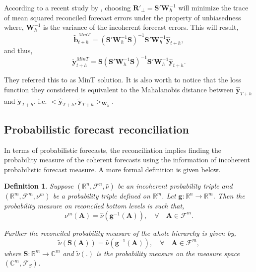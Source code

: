 \documentclass[a4paper, 11pt]{article}
\newtheorem{definition}{Definition}[section]
\begin{document}
	According to a recent study by \citet{Wickramasuriya2017}, choosing $\bm{R}'_\bot = \bm{S}'\bm{W}^{-1}_{h}$ will minimize the trace of mean squared reconciled forecast errors under the property of unbiasedness where, $\bm{W}^{-1}_{h}$ is the variance of the incoherent forecast errors. This will result,
	\begin{equation*}
	\tilde{\bm{b}}^{MinT}_{t+h}=(\bm{S}'\bm{W}^{-1}_{h} \bm{S})^{-1}\bm{S}'\bm{W}^{-1}_{h} \hat{\bm{y}}_{t+h},
	\end{equation*}
	and thus,
	\begin{equation}
	\tilde{\bm{y}}^{MinT}_{t+h}=\bm{S}(\bm{S}' \bm{W}^{-1}_{h}\bm{S})^{-1}\bm{S}'\bm{W}^{-1}_{h} \hat{\bm{y}}_{t+h}.
	\end{equation}
	
	They referred this to as MinT solution. It is also worth to notice that the loss function they considered is equivalent to the Mahalanobis distance between $\hat{\bm{y}}_{T+h}$ and $\tilde{\bm{y}}_{T+h}$. i.e. $<\hat{\bm{y}}_{T+h}, \tilde{\bm{y}}_{T+h}>_{\bm{W}_h}$.
	
	\subsection{Probabilistic forecast reconciliation}
	
	In terms of probabilistic forecasts, the reconciliation implies finding the probability measure of the coherent forecasts using the information of incoherent probabilistic forecast measure. A more formal definition is given below.
	
	\begin{definition} \label{def:reconprob}
		Suppose $(\mathbb{R}^n, \mathscr{F}^n, \hat{\nu})$ be an incoherent probability triple and $(\mathbb{R}^m, \mathscr{F}^m, \nu^m)$ be a probability triple defined on $\mathbb{R}^m$. Let $\bm{g}:\mathbb{R}^n \rightarrow \mathbb{R}^m $. Then the probability measure on reconciled bottom levels is such that,
		\begin{equation}
		\nu^m(\bm{A}) = \hat{\nu}(\bm{g}^{-1}(\bm{A})), \quad \forall \quad \bm{A} \in \mathscr{F}^m.
		\end{equation}
		
		Further the reconciled probability measure of the whole hierarchy is given by,
		\begin{equation}
		\tilde{\nu}(\bm{S}(\bm{A})) = \hat{\nu}(\bm{g}^{-1}(\bm{A})), \quad \forall \quad \bm{A} \in \mathscr{F}^m,
		\end{equation}
		where $\bm{S}:\mathbb{R}^m \rightarrow \mathbb{C}^m$ and $\tilde{\nu}(.)$ is the probability measure on the measure space $(\mathbb{C}^m, \mathscr{F}_S)$.
	\end{definition}
	
\end{document}
